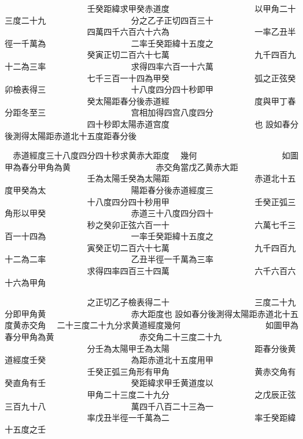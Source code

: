 \begin{正文}
　　　　　　　　　　壬癸距緯求甲癸赤道度
　　　　　　　　　　以甲角二十三度二十九
　　　　　　　　　　分之乙子正切四百三十
　　　　　　　　　　四萬四千六百六十六為
　　　　　　　　　　一率乙丑半徑一千萬為
　　　　　　　　　　二率壬癸距緯十五度之
　　　　　　　　　　癸寅正切二百六十七萬
　　　　　　　　　　九千四百九十二為三率
　　　　　　　　　　求得四率六百一十六萬
　　　　　　　　　　七千三百一十四為甲癸
　　　　　　　　　　弧之正弦癸卯檢表得三
　　　　　　　　　　十八度四分四十秒即甲
　　　　　　　　　　癸太陽距春分後赤道經
　　　　　　　　　　度與甲丁春分距冬至三
　　　　　　　　　　宫相加得四宫八度四分
　　　　　　　　　　四十秒即太陽赤道宫度
　　　　　　　　　　也
設如春分後測得太陽距赤道北十五度距春分後
\par
\end{正文}\clearpage
{}
\begin{正文}
　赤道經度三十八度四分四十秒求黄赤大距度
　幾何
　　　　　　　　　　如圖甲為春分甲角為黄
　　　　　　　　　　赤交角當戊乙黄赤大距
　　　　　　　　　　壬為太陽壬癸為太陽距
　　　　　　　　　　赤道北十五度甲癸為太
　　　　　　　　　　陽距春分後赤道經度三
　　　　　　　　　　十八度四分四十秒用甲
　　　　　　　　　　壬癸正弧三角形以甲癸
　　　　　　　　　　赤道三十八度四分四十
　　　　　　　　　　秒之癸卯正弦六百一十
　　　　　　　　　　六萬七千三百一十四為
　　　　　　　　　　一率壬癸距緯十五度之
　　　　　　　　　　寅癸正切二百六十七萬
　　　　　　　　　　九千四百九十二為二率
　　　　　　　　　　乙丑半徑一千萬為三率
　　　　　　　　　　求得四率四百三十四萬
　　　　　　　　　　六千六百六十六為甲角
\par
\end{正文}\clearpage
{}
\begin{正文}
　　　　　　　　　　之正切乙子檢表得二十
　　　　　　　　　　三度二十九分即甲角黄
　　　　　　　　　　赤大距度也
設如春分後測得太陽距赤道北十五度黄赤交角
　二十三度二十九分求黄道經度幾何
　　　　　　　　　　如圖甲為春分甲角為黄
　　　　　　　　　　赤交角二十三度二十九
　　　　　　　　　　分壬為太陽甲壬為太陽
　　　　　　　　　　距春分後黄道經度壬癸
　　　　　　　　　　為距赤道北十五度用甲
　　　　　　　　　　壬癸正弧三角形有甲角
　　　　　　　　　　黄赤交角有癸直角有壬
　　　　　　　　　　癸距緯求甲壬黄道度以
　　　　　　　　　　甲角二十三度二十九分
　　　　　　　　　　之戊辰正弦三百九十八
　　　　　　　　　　萬四千八百二十三為一
　　　　　　　　　　率戊丑半徑一千萬為二
　　　　　　　　　　率壬癸距緯十五度之壬
\par
\end{正文}\clearpage

